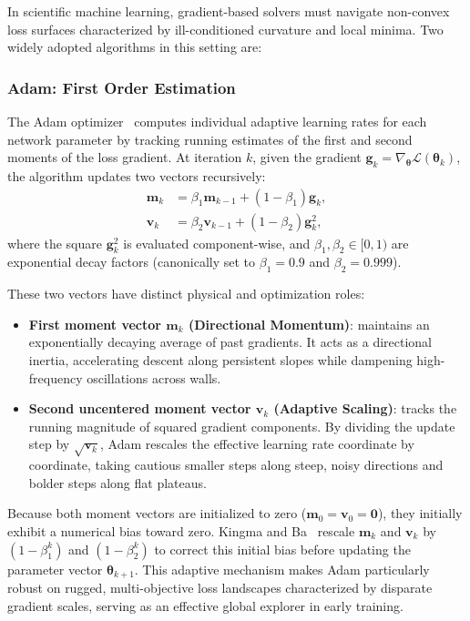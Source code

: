 In scientific machine learning, gradient-based solvers must navigate non-convex
loss surfaces characterized by ill-conditioned curvature and local minima.
Two widely adopted algorithms in this setting are:

\subsubsection{Adam: First Order Estimation}
\label{subsubsec:adam_optimizer}

The Adam optimizer~\cite{kingma2014adam} computes individual adaptive learning
rates for each network parameter by tracking running estimates of the first
and second moments of the loss gradient.
At iteration $k$, given the gradient $\boldsymbol{g}_k = \nabla_{\boldsymbol{\theta}} \mathcal{L}(\boldsymbol{\theta}_k)$,
the algorithm updates two vectors recursively:
\begin{align}
    \boldsymbol{m}_k &= \beta_1 \boldsymbol{m}_{k-1} + (1 - \beta_1) \boldsymbol{g}_k , \label{eq:adam_first_moment} \\
    \boldsymbol{v}_k &= \beta_2 \boldsymbol{v}_{k-1} + (1 - \beta_2) \boldsymbol{g}_k^2 , \label{eq:adam_second_moment}
\end{align}
where the square $\boldsymbol{g}_k^2$ is evaluated component-wise, and $\beta_1, \beta_2 \in [0, 1)$
are exponential decay factors (canonically set to $\beta_1 = 0.9$ and $\beta_2 = 0.999$).

These two vectors have distinct physical and optimization roles:
\begin{itemize}
    \item \textbf{First moment vector $\boldsymbol{m}_k$ (Directional Momentum)}:
        maintains an exponentially decaying average of past gradients.
        It acts as a directional inertia, accelerating descent along persistent slopes
        while dampening high-frequency oscillations across walls.
    \item \textbf{Second uncentered moment vector $\boldsymbol{v}_k$ (Adaptive Scaling)}:
        tracks the running magnitude of squared gradient components.
        By dividing the update step by $\sqrt{\boldsymbol{v}_k}$, Adam rescales the effective
        learning rate coordinate by coordinate, taking cautious smaller steps along steep,
        noisy directions and bolder steps along flat plateaus.
\end{itemize}

Because both moment vectors are initialized to zero ($\boldsymbol{m}_0 = \boldsymbol{v}_0 = \boldsymbol{0}$),
they initially exhibit a numerical bias toward zero.
Kingma and Ba~\cite{kingma2014adam} rescale $\boldsymbol{m}_k$ and $\boldsymbol{v}_k$ by $(1 - \beta_1^k)$
and $(1 - \beta_2^k)$ to correct this initial bias before updating the parameter vector $\boldsymbol{\theta}_{k+1}$.
This adaptive mechanism makes Adam particularly robust on rugged, multi-objective loss landscapes
characterized by disparate gradient scales, serving as an effective global explorer in early training.

